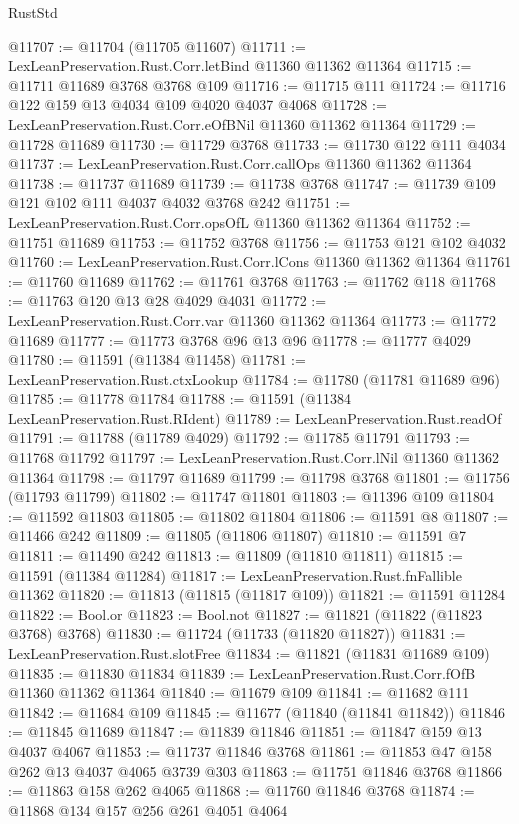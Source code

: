 \begin{lexlean}{RustStd}
\begin{coremodule}
@11707 := @11704 (@11705 @11607)
@11711 := LexLeanPreservation.Rust.Corr.letBind @11360 @11362 @11364
@11715 := @11711 @11689 @3768 @3768 @109
@11716 := @11715 @111
@11724 := @11716 @122 @159 @13 @4034 @109 @4020 @4037 @4068
@11728 := LexLeanPreservation.Rust.Corr.eOfBNil @11360 @11362 @11364
@11729 := @11728 @11689
@11730 := @11729 @3768
@11733 := @11730 @122 @111 @4034
@11737 := LexLeanPreservation.Rust.Corr.callOps @11360 @11362 @11364
@11738 := @11737 @11689
@11739 := @11738 @3768
@11747 := @11739 @109 @121 @102 @111 @4037 @4032 @3768 @242
@11751 := LexLeanPreservation.Rust.Corr.opsOfL @11360 @11362 @11364
@11752 := @11751 @11689
@11753 := @11752 @3768
@11756 := @11753 @121 @102 @4032
@11760 := LexLeanPreservation.Rust.Corr.lCons @11360 @11362 @11364
@11761 := @11760 @11689
@11762 := @11761 @3768
@11763 := @11762 @118
@11768 := @11763 @120 @13 @28 @4029 @4031
@11772 := LexLeanPreservation.Rust.Corr.var @11360 @11362 @11364
@11773 := @11772 @11689
@11777 := @11773 @3768 @96 @13 @96
@11778 := @11777 @4029
@11780 := @11591 (@11384 @11458)
@11781 := LexLeanPreservation.Rust.ctxLookup
@11784 := @11780 (@11781 @11689 @96)
@11785 := @11778 @11784
@11788 := @11591 (@11384 LexLeanPreservation.Rust.RIdent)
@11789 := LexLeanPreservation.Rust.readOf
@11791 := @11788 (@11789 @4029)
@11792 := @11785 @11791
@11793 := @11768 @11792
@11797 := LexLeanPreservation.Rust.Corr.lNil @11360 @11362 @11364
@11798 := @11797 @11689
@11799 := @11798 @3768
@11801 := @11756 (@11793 @11799)
@11802 := @11747 @11801
@11803 := @11396 @109
@11804 := @11592 @11803
@11805 := @11802 @11804
@11806 := @11591 @8
@11807 := @11466 @242
@11809 := @11805 (@11806 @11807)
@11810 := @11591 @7
@11811 := @11490 @242
@11813 := @11809 (@11810 @11811)
@11815 := @11591 (@11384 @11284)
@11817 := LexLeanPreservation.Rust.fnFallible @11362
@11820 := @11813 (@11815 (@11817 @109))
@11821 := @11591 @11284
@11822 := Bool.or
@11823 := Bool.not
@11827 := @11821 (@11822 (@11823 @3768) @3768)
@11830 := @11724 (@11733 (@11820 @11827))
@11831 := LexLeanPreservation.Rust.slotFree
@11834 := @11821 (@11831 @11689 @109)
@11835 := @11830 @11834
@11839 := LexLeanPreservation.Rust.Corr.fOfB @11360 @11362 @11364
@11840 := @11679 @109
@11841 := @11682 @111
@11842 := @11684 @109
@11845 := @11677 (@11840 (@11841 @11842))
@11846 := @11845 @11689
@11847 := @11839 @11846
@11851 := @11847 @159 @13 @4037 @4067
@11853 := @11737 @11846 @3768
@11861 := @11853 @47 @158 @262 @13 @4037 @4065 @3739 @303
@11863 := @11751 @11846 @3768
@11866 := @11863 @158 @262 @4065
@11868 := @11760 @11846 @3768
@11874 := @11868 @134 @157 @256 @261 @4051 @4064

\end{coremodule}
\end{lexlean}
